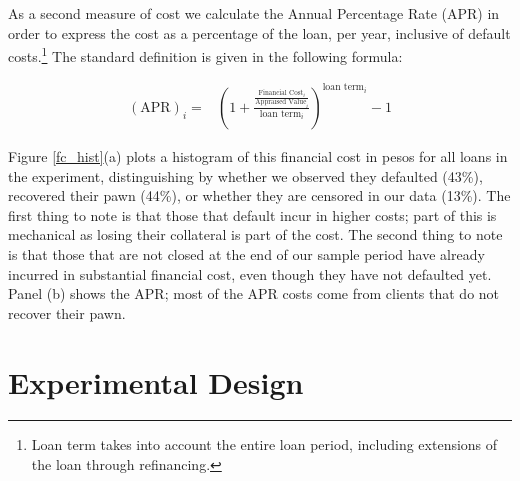 \documentclass[oneside,11pt]{article}
\begin{document}
As a second measure of cost we calculate the Annual Percentage Rate (APR) in order to express the cost as a percentage of the loan, per year, inclusive of default costs.\footnote{Loan term takes into account the entire loan period, including extensions of the loan through refinancing.} The standard definition is given in the following formula:


\begin{align*}
    (\text{APR})_i =&\left( 1 + \frac{\frac{\text{Financial Cost}_i}{\text{Appraised Value}_i}}{\text{loan term}_i}\right)^{\text{loan term}_i}-1 
\end{align*}

\vspace{.1in}

Figure \ref{fc_hist}(a) plots a histogram of this financial cost in pesos for all loans in the experiment, distinguishing by whether we observed they defaulted (43\%), recovered their pawn (44\%), or whether they are censored in our data (13\%). The first thing to note is that those that default incur in higher costs; part of this is mechanical as losing their collateral is part of the cost. The second thing to note is that those that are not closed at the end of our sample period have already incurred in substantial financial cost, even though they have not defaulted yet. Panel (b) shows the APR; most of the APR costs come from clients that do not recover their pawn. 





\section{Experimental Design} \label{Design}
\end{document}
